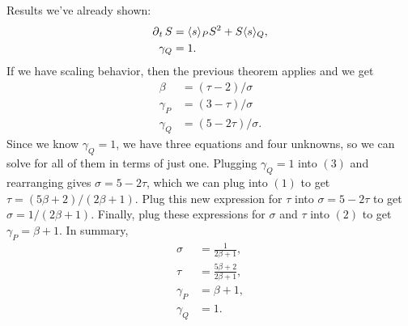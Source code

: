 \documentclass[twoside,10pt]{report}
\begin{document}
Results we've already shown:
\begin{align*}
	\operatorname{\partial}_{t}{S} &= \langle s \rangle_{P} S^2 + S\langle s \rangle_{Q}, \\
	\gamma_{Q} &= 1.
\end{align*}
If we have scaling behavior, then the previous theorem applies and we get
\begin{align*}
	\beta &= (\tau-2)/\sigma \tag{1} \\
	\gamma_{P} &= (3-\tau)/\sigma \tag{2} \\
	\gamma_{Q} &= (5-2\tau)/\sigma. \tag{3}
\end{align*}
Since we know $\gamma_{Q}=1$, we have three equations and four unknowns, so we can solve for all of them in terms of just one. Plugging $\gamma_{Q}=1$ into $(3)$ and rearranging gives $\sigma=5-2\tau$, which we can plug into $(1)$ to get $\tau = (5\beta+2)/(2\beta+1)$. Plug this new expression for $\tau$ into $\sigma=5-2\tau$ to get $\sigma = 1/(2\beta+1)$. Finally, plug these expressions for $\sigma$ and $\tau$ into $(2)$ to get $\gamma_{P} = \beta+1$. In summary,
\begin{align*}
	\sigma &= \frac{1}{2\beta+1} , \\
	\tau &= \frac{5\beta+2}{2\beta+1} , \\
	\gamma_{P} &= \beta+1, \\
	\gamma_{Q} &= 1.
\end{align*}
\end{document}
